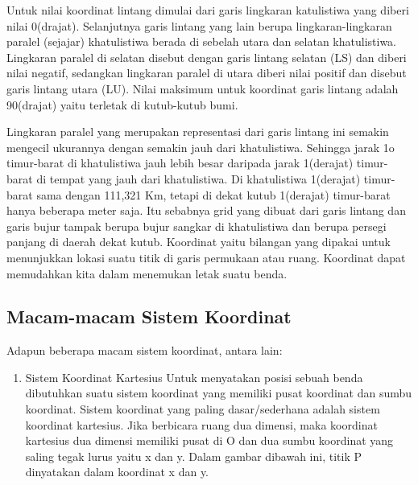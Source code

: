 Untuk nilai koordinat lintang dimulai dari garis lingkaran katulistiwa yang diberi nilai 0(drajat). Selanjutnya garis lintang yang lain berupa lingkaran-lingkaran paralel (sejajar) khatulistiwa berada di sebelah utara dan selatan khatulistiwa. Lingkaran paralel di selatan disebut dengan garis lintang selatan (LS) dan diberi nilai negatif, sedangkan lingkaran paralel di utara diberi nilai positif  dan disebut garis lintang utara (LU). Nilai maksimum untuk koordinat garis lintang adalah 90(drajat) yaitu terletak di kutub-kutub bumi.

Lingkaran paralel yang merupakan representasi dari garis lintang ini semakin mengecil ukurannya dengan semakin jauh dari khatulistiwa. Sehingga jarak 1o timur-barat di khatulistiwa jauh lebih besar daripada jarak 1(derajat) timur-barat di tempat yang jauh dari khatulistiwa. Di khatulistiwa 1(derajat) timur-barat sama dengan 111,321 Km, tetapi di dekat kutub 1(derajat) timur-barat hanya beberapa meter saja. Itu sebabnya grid yang dibuat dari garis lintang dan garis bujur tampak berupa bujur sangkar di khatulistiwa dan berupa persegi panjang di daerah dekat kutub. Koordinat yaitu bilangan yang dipakai untuk menunjukkan lokasi suatu titik di garis permukaan atau ruang. Koordinat dapat memudahkan kita dalam menemukan letak suatu benda.
\subsection{Macam-macam Sistem Koordinat}
Adapun beberapa macam sistem koordinat, antara lain:
\begin{enumerate}
\item Sistem Koordinat Kartesius
Untuk menyatakan posisi sebuah benda dibutuhkan suatu sistem koordinat yang memiliki pusat koordinat dan sumbu koordinat. Sistem koordinat yang paling dasar/sederhana adalah sistem koordinat kartesius. Jika berbicara ruang dua dimensi, maka koordinat kartesius dua dimensi memiliki pusat di O dan dua sumbu koordinat yang saling tegak lurus yaitu x dan y. Dalam gambar dibawah ini, titik P dinyatakan dalam koordinat x dan y.
\end{enumerate}